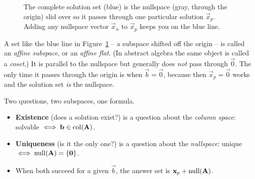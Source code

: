 \begin{figure}[htbp]
\centering
{}
\caption{The complete solution set (blue) is the nullspace (gray, through the origin)
slid over so it passes through one particular solution $\vec x_p$. Adding any nullspace
vector $\vec x_n$ to $\vec x_p$ keeps you on the blue line.}
\label{ch13:translate}
\end{figure}

A set like the blue line in Figure~\ref{ch13:translate} -- a subspace shifted off the
origin -- is called an \emph{affine subspace}, or an \emph{affine flat}. (In abstract
algebra the same object is called a \emph{coset}.) It is parallel to the
nullspace but generally does \emph{not} pass through $\vec{0}$. The only time it passes
through the origin is when $\vec{b}=\vec{0}$, because then $\vec{x}_p=\vec{0}$ works and the
solution set \emph{is} the nullspace.

\begin{focusbox}
Two questions, two subspaces, one formula.
\begin{itemize}
  \item \textbf{Existence} (does a solution exist?) is a question about the \emph{column
    space}: solvable $\iff \mathbf{b}\in\operatorname{col}(\mathbf{A})$.
  \item \textbf{Uniqueness} (is it the only one?) is a question about the
    \emph{nullspace}: unique $\iff \operatorname{null}(\mathbf{A})=\{\mathbf{0}\}$.
  \item When both succeed for a given $\vec{b}$, the answer set is
    $\mathbf{x}_p+\operatorname{null}(\mathbf{A})$.
\end{itemize}
\end{focusbox}

